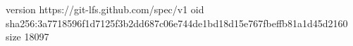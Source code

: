 version https://git-lfs.github.com/spec/v1
oid sha256:3a7718596f1d7125f3b2dd687c06e744de1bd18d15e767fbeffb81a1d45d2160
size 18097
